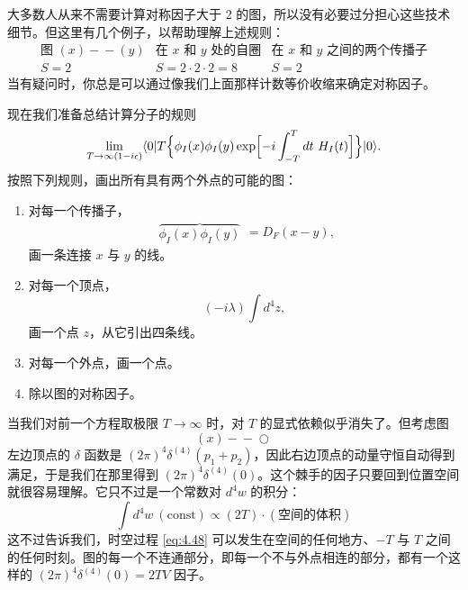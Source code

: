 大多数人从来不需要计算对称因子大于 2 的图，所以没有必要过分担心这些技术细节。但这里有几个例子，以帮助理解上述规则：
\begin{equation}
  \begin{array}{ccc}
    \text{图 } (x)\!-\!-\!(y) & \text{在 } x \text{ 和 } y \text{ 处的自圈} &
      \text{在 } x \text{ 和 } y \text{ 之间的两个传播子}\\
    S = 2 & S = 2\cdot2\cdot2 = 8 & S = 2
  \end{array}
\end{equation}
当有疑问时，你总是可以通过像我们上面那样计数等价收缩来确定对称因子。

现在我们准备总结计算分子的规则
\begin{equation}
  \lim_{T\to\infty(1-i\epsilon)}
    \langle 0|T\Bigl\{ \phi_I(x)\phi_I(y)\exp\Bigl[ -i\int_{-T}^{T}dt\ H_I(t)
      \Bigr] \Bigr\}|0\rangle .
\end{equation}
按照下列规则，画出所有具有两个外点的可能的图：
\begin{enumerate}
  \item 对每一个传播子，
    \begin{equation}
      \begin{array}{c}
        \overbrace{\phi_I(x)\phi_I(y)}
      \end{array} = D_F(x-y),
    \end{equation}
    画一条连接 $x$ 与 $y$ 的线。
  \item 对每一个顶点，
    \begin{equation}
      (-i\lambda)\int d^4z,
    \end{equation}
    画一个点 $z$，从它引出四条线。
  \item 对每一个外点，画一个点。
  \item 除以图的对称因子。
\end{enumerate}

当我们对前一个方程取极限 $T\to\infty$ 时，对 $T$ 的显式依赖似乎消失了。但考虑图
\begin{equation}
  (x)\!-\!-\!\bigcirc
\end{equation}
左边顶点的 $\delta$ 函数是 $(2\pi)^4\delta^{(4)}(p_1+p_2)$，因此右边顶点的动量守恒自动得到满足，于是我们在那里得到 $(2\pi)^4\delta^{(4)}(0)$。这个棘手的因子只要回到位置空间就很容易理解。它只不过是一个常数对 $d^4w$ 的积分：
\begin{equation}
  \int d^4w\ (\text{const}) \propto (2T)\cdot(\text{空间的体积})
  \label{eq:4.49}
\end{equation}
这不过告诉我们，时空过程 \eqref{eq:4.48} 可以发生在空间的任何地方、$-T$ 与 $T$ 之间的任何时刻。图的每一个不连通部分，即每一个不与外点相连的部分，都有一个这样的 $(2\pi)^4\delta^{(4)}(0) = 2TV$ 因子。

